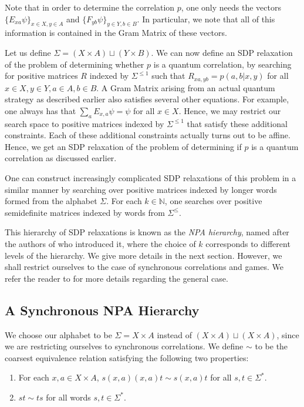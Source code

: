 \documentclass[11pt,a4paper]{article}
\theoremstyle{plain}
\theoremstyle{remark}
\theoremstyle{definition}
\begin{document}
Note that in order to determine the correlation $p$, one only needs the vectors $\{E_{xa}\psi\}_{x\in X, y \in A}$ and $\{F_{yb}\psi\}_{y \in Y, b \in B}$. In particular, we note that all of this information is contained in the Gram Matrix of these vectors. 

Let us define $\Sigma = (X \times A) \sqcup (Y \times B)$. We can now define an SDP relaxation of the problem of determining whether $p$ is a quantum correlation, by searching for positive matrices $R$ indexed by $\Sigma^{\leq 1}$ such that $R_{xa, yb} = p(a,b|x,y)$ for all $x \in X, y \in Y, a \in A, b \in B$. A Gram Matrix arising from an actual quantum strategy as described earlier also satisfies several other equations. For example, one always has that $\sum_{a} E_{x,a}\psi = \psi$ for all $x \in X$. Hence, we may restrict our search space to positive matrices indexed by $\Sigma^{\leq 1}$ that satisfy these additional constraints. Each of these additional constraints actually turns out to be affine. Hence, we get an SDP relaxation of the problem of determining if $p$ is a quantum correlation as discussed earlier. 

One can construct increasingly complicated SDP relaxations of this problem in a similar manner by searching over positive matrices indexed by longer words formed from the alphabet $\Sigma$. For each $k \in \mathbb{N}$, one searches over positive semidefinite matrices indexed by words from $\Sigma^{\leq}$.

This hierarchy of SDP relaxations is known as the \emph{NPA hierarchy}, named after the authors of \cite{Navascues_2008} who introduced it, where the choice of $k$ corresponds to different levels of the hierarchy. We give more details in the next section. However, we shall restrict ourselves to the case of synchronous correlations and games. We refer the reader to \cite{Navascues_2008} for more details regarding the general case. 

\subsection{A Synchronous NPA Hierarchy}

We choose our alphabet to be $\Sigma = X \times A$ instead of $(X \times A) \sqcup (X\times A)$, since we are restricting ourselves to synchronous correlations. We define $\sim$ to be the coarsest equivalence relation satisfying the following two properties: \begin{enumerate}
    \item For each $x,a \in X \times A$, $s(x,a)(x,a)t \sim s(x,a)t$ for all $s,t \in \Sigma^*$.\item $st \sim ts$ for all words $s,t \in \Sigma^*$. \end{enumerate}
\end{document}

